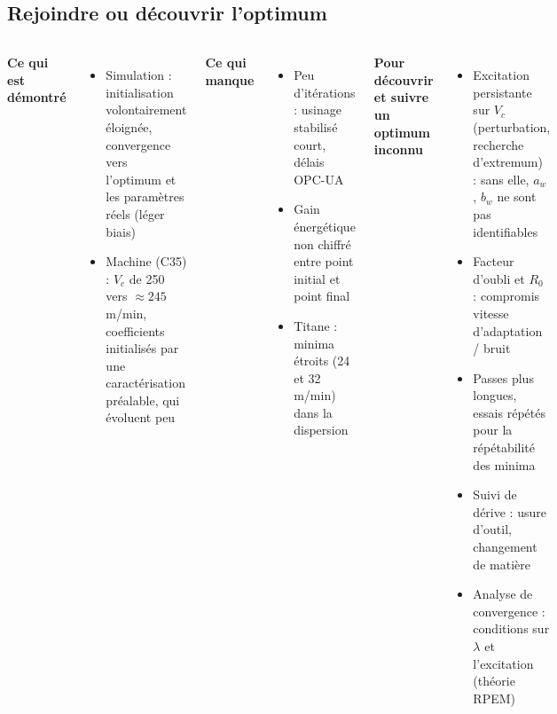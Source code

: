 \subsection*{Rejoindre ou découvrir l'optimum}
\begin{frame}

    \begin{columns}[t]
        \textbf{Ce qui est démontré}
        \begin{itemize}
            \item Simulation : initialisation \alert{volontairement éloignée}, convergence vers l'optimum et les paramètres réels (léger biais)
            \item Machine (C35) : $V_c$ de 250 vers $\approx 245$\,m/min, coefficients initialisés par une caractérisation préalable, qui évoluent peu
        \end{itemize}
        \textbf{Ce qui manque}
        \begin{itemize}
            \item Peu d'itérations : usinage stabilisé court, délais OPC-UA
            \item Gain énergétique non chiffré entre point initial et point final
            \item Titane : minima étroits (24 et 32\,m/min) dans la dispersion
        \end{itemize}
        \textbf{Pour découvrir et suivre un optimum inconnu}
        \begin{itemize}
            \item \alert{Excitation persistante} sur $V_c$ (perturbation, recherche d'extremum) : sans elle, $a_w$, $b_w$ ne sont pas identifiables
            \item Facteur d'oubli et $R_0$ : compromis vitesse d'adaptation / bruit
            \item Passes plus longues, essais répétés pour la répétabilité des minima
            \item Suivi de dérive : usure d'outil, changement de matière
            \item Analyse de convergence : conditions sur $\lambda$ et l'excitation (théorie RPEM)
        \end{itemize}
    \end{columns}
\end{frame}
